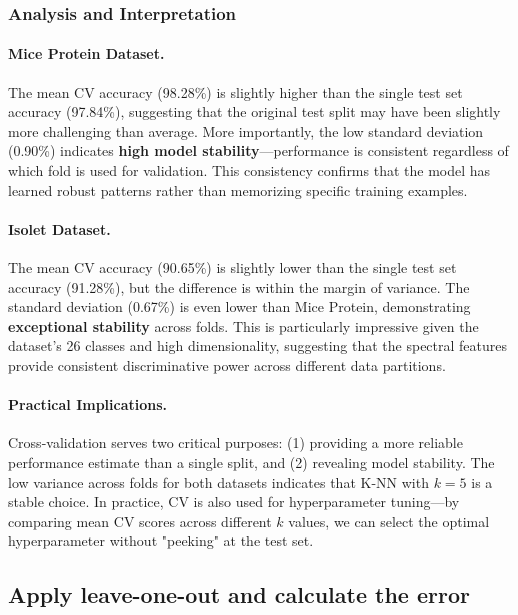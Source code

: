 \documentclass[12pt]{article}
\begin{document}
\subsubsection{Analysis and Interpretation}

\paragraph{Mice Protein Dataset.} The mean CV accuracy (98.28\%) is slightly higher than the single test set accuracy (97.84\%), suggesting that the original test split may have been slightly more challenging than average. More importantly, the low standard deviation (0.90\%) indicates \textbf{high model stability}—performance is consistent regardless of which fold is used for validation. This consistency confirms that the model has learned robust patterns rather than memorizing specific training examples.

\paragraph{Isolet Dataset.} The mean CV accuracy (90.65\%) is slightly lower than the single test set accuracy (91.28\%), but the difference is within the margin of variance. The standard deviation (0.67\%) is even lower than Mice Protein, demonstrating \textbf{exceptional stability} across folds. This is particularly impressive given the dataset's 26 classes and high dimensionality, suggesting that the spectral features provide consistent discriminative power across different data partitions.

\paragraph{Practical Implications.} Cross-validation serves two critical purposes: (1) providing a more reliable performance estimate than a single split, and (2) revealing model stability. The low variance across folds for both datasets indicates that K-NN with $k=5$ is a stable choice. In practice, CV is also used for hyperparameter tuning—by comparing mean CV scores across different $k$ values, we can select the optimal hyperparameter without "peeking" at the test set.

\subsection{Apply leave-one-out and calculate the error}
\end{document}
